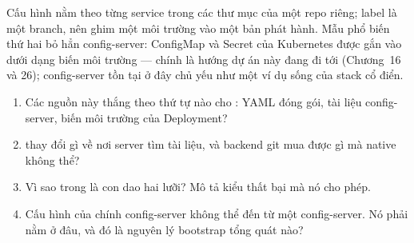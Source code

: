 Cấu hình nằm theo từng service trong các thư mục của một repo riêng;
label là một branch, nên  ghim một môi
trường vào một bản phát hành. Mẫu phổ biến thứ hai bỏ hẳn config-server:
ConfigMap và Secret của Kubernetes được gắn vào dưới dạng biến môi trường
--- chính là hướng dự án này đang đi tới (Chương~16 và 26); config-server
tồn tại ở đây chủ yếu như một ví dụ sống của stack cổ điển.

\begin{quiz}
\begin{enumerate}
  \item Các nguồn này thắng theo thứ tự nào cho
  : YAML đóng gói, tài liệu config-server,
  biến môi trường của Deployment?
  \item {} thay đổi gì về nơi server tìm tài
  liệu, và backend git mua được gì mà native không thể?
  \item Vì sao  trong  là con
  dao hai lưỡi? Mô tả kiểu thất bại mà nó cho phép.
  \item Cấu hình của chính config-server không thể đến từ một
  config-server. Nó phải nằm ở đâu, và đó là nguyên lý bootstrap tổng
  quát nào?
\end{enumerate}
\end{quiz}
